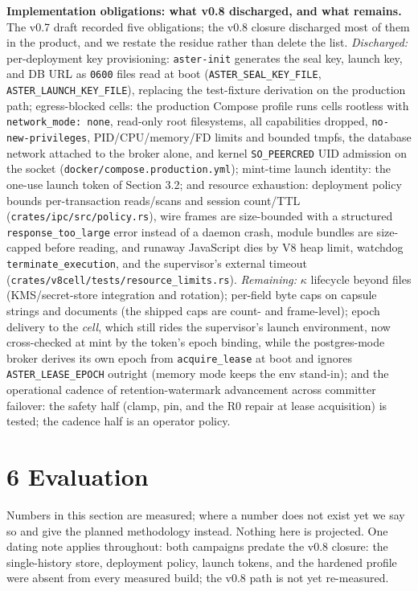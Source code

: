 \documentclass[
  11pt,
]{article}
\newcounter{none} %
\begin{document}
\textbf{Implementation obligations: what v0.8 discharged, and what remains.} The v0.7 draft recorded five obligations; the v0.8 closure discharged most of them in the product, and we restate the residue rather than delete the list. \emph{Discharged:} per-deployment key provisioning: \texttt{aster-init} generates the seal key, launch key, and DB URL as \texttt{0600} files read at boot (\texttt{ASTER\_SEAL\_KEY\_FILE}, \texttt{ASTER\_LAUNCH\_KEY\_FILE}), replacing the test-fixture derivation on the production path; egress-blocked cells: the production Compose profile runs cells rootless with \texttt{network\_mode:\ none}, read-only root filesystems, all capabilities dropped, \texttt{no-new-privileges}, PID/CPU/memory/FD limits and bounded tmpfs, the database network attached to the broker alone, and kernel \texttt{SO\_PEERCRED} UID admission on the socket (\texttt{docker/compose.production.yml}); mint-time launch identity: the one-use launch token of Section 3.2; and resource exhaustion: deployment policy bounds per-transaction reads/scans and session count/TTL (\texttt{crates/ipc/src/policy.rs}), wire frames are size-bounded with a structured \texttt{response\_too\_large} error instead of a daemon crash, module bundles are size-capped before reading, and runaway JavaScript dies by V8 heap limit, watchdog \texttt{terminate\_execution}, and the supervisor's external timeout (\texttt{crates/v8cell/tests/resource\_limits.rs}). \emph{Remaining:} $\kappa$ lifecycle beyond files (KMS/secret-store integration and rotation); per-field byte caps on capsule strings and documents (the shipped caps are count- and frame-level); epoch delivery to the \emph{cell}, which still rides the supervisor's launch environment, now cross-checked at mint by the token's epoch binding, while the postgres-mode broker derives its own epoch from \texttt{acquire\_lease} at boot and ignores \texttt{ASTER\_LEASE\_EPOCH} outright (memory mode keeps the env stand-in); and the operational cadence of retention-watermark advancement across committer failover: the safety half (clamp, pin, and the R0 repair at lease acquisition) is tested; the cadence half is an operator policy.

\section{6 Evaluation}\label{evaluation}

Numbers in this section are measured; where a number does not exist yet we say so and give the planned methodology instead. Nothing here is projected. One dating note applies throughout: both campaigns predate the v0.8 closure: the single-history store, deployment policy, launch tokens, and the hardened profile were absent from every measured build; the v0.8 path is not yet re-measured.
\end{document}
